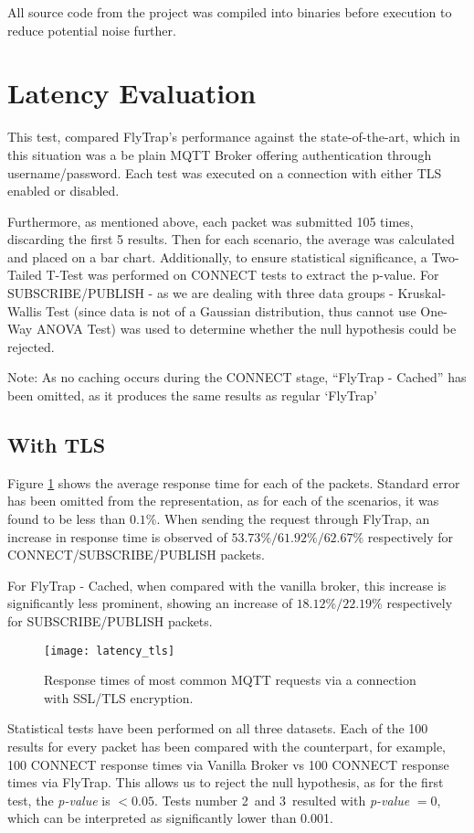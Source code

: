 All source code from the project was compiled into binaries before execution to reduce potential noise further.

\section{Latency Evaluation}
This test, compared FlyTrap's performance against the state-of-the-art, which in this situation was a be plain MQTT Broker offering authentication through username/password. Each test was executed on a connection with either TLS enabled or disabled.

Furthermore, as mentioned above, each packet was submitted 105 times, discarding the first 5 results. Then for each scenario, the average was calculated and placed on a bar chart. Additionally, to ensure statistical significance, a Two-Tailed T-Test was performed on CONNECT tests to extract the p-value. For SUBSCRIBE/PUBLISH - as we are dealing with three data groups - Kruskal-Wallis Test (since data is not of a Gaussian distribution, thus cannot use One-Way ANOVA Test) was used to determine whether the null hypothesis could be rejected.

Note: As no caching occurs during the CONNECT stage, ``FlyTrap - Cached'' has been omitted, as it produces the same results as regular `FlyTrap'

\subsection{With TLS}\label{sec:tls_eval}
Figure \ref{fig:latency_tls} shows the average response time for each of the packets. Standard error has been omitted from the representation, as for each of the scenarios, it was found to be less than $0.1\%$. When sending the request through FlyTrap, an increase in response time is observed of $53.73\%/61.92\%/62.67\%$ respectively for CONNECT/SUBSCRIBE/PUBLISH packets.

For FlyTrap - Cached, when compared with the vanilla broker, this increase is significantly less prominent, showing an increase of $18.12\%/22.19\%$ respectively for SUBSCRIBE/PUBLISH packets. 
\begin{figure}[h]
    \centering
    \texttt{[image: latency\_tls]}
    \caption{Response times of most common MQTT requests via a connection with SSL/TLS encryption.}
    \label{fig:latency_tls}
\end{figure}

Statistical tests have been performed on all three datasets. Each of the 100 results for every packet has been compared with the counterpart, for example, 100 CONNECT response times via Vanilla Broker vs 100 CONNECT response times via FlyTrap. This allows us to reject the null hypothesis, as for the first test, the \textit{p-value} is $<0.05$. Tests number 2\ and 3\ resulted with \textit{p-value} $=0$, which can be interpreted as significantly lower than 0.001.


